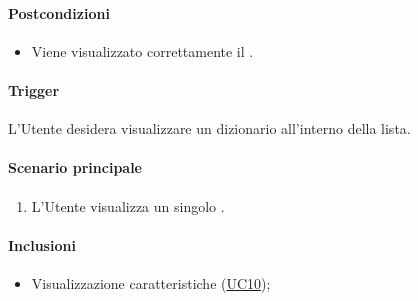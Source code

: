 \paragraph*{Postcondizioni}
\begin{itemize}
  \item Viene visualizzato correttamente il .
\end{itemize}

\paragraph*{Trigger}
L'Utente desidera visualizzare un dizionario all'interno della lista.

\paragraph*{Scenario principale}
\begin{enumerate}
  \item L'Utente visualizza un singolo .
\end{enumerate}

\paragraph*{Inclusioni}
\begin{itemize}
  \item Visualizzazione caratteristiche  (\hyperref[UC10]{UC10});
\end{itemize}